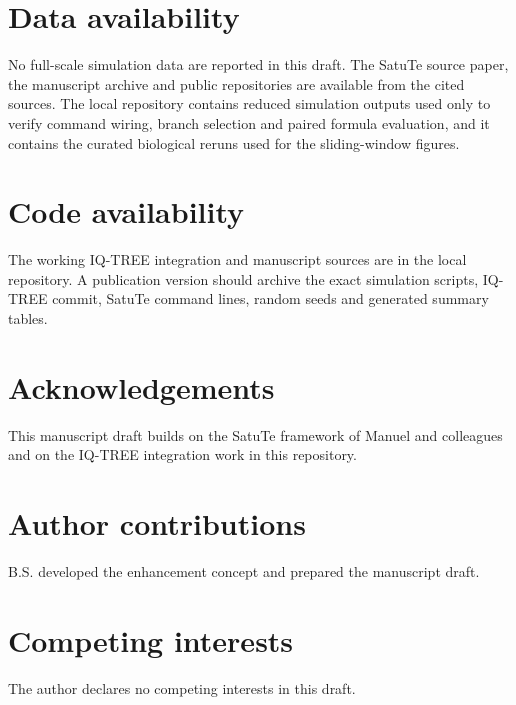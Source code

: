 \documentclass[11pt]{article}
\begin{document}
\section*{Data availability}

No full-scale simulation data are reported in this draft. The SatuTe source paper, the manuscript archive and public repositories are available from the cited sources. The local repository contains reduced simulation outputs used only to verify command wiring, branch selection and paired formula evaluation, and it contains the curated biological reruns used for the sliding-window figures.

\section*{Code availability}

The working IQ-TREE integration and manuscript sources are in the local repository. A publication version should archive the exact simulation scripts, IQ-TREE commit, SatuTe command lines, random seeds and generated summary tables.

\section*{Acknowledgements}

This manuscript draft builds on the SatuTe framework of Manuel and colleagues and on the IQ-TREE integration work in this repository.

\section*{Author contributions}

B.S. developed the enhancement concept and prepared the manuscript draft.

\section*{Competing interests}

The author declares no competing interests in this draft.
\end{document}
